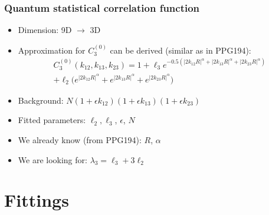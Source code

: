 \documentclass{beamer}
\begin{document}
\begin{frame}
\frametitle{Quantum statistical correlation function}
\begin{itemize}
\setlength{\itemsep}{16pt}
\item Dimension: 9D $\rightarrow$ 3D
\item Approximation for $C_3^{(0)}$ can be derived (similar as in PPG194):
\begin{align}
C_3^{(0)}(k_{12}, k_{13}, k_{23}) = 1+ \ell_3e^{-0.5(|2k_{12}R|^\alpha+|2k_{13}R|^\alpha+|2k_{23}R|^\alpha)}\nonumber\\
+\ell_2\bigg(e^{|2k_{12}R|^\alpha}+e^{|2k_{13}R|^\alpha}+e^{|2k_{23}R|^\alpha}\bigg)
\end{align}
\item Background: $N(1+\epsilon k_{12})(1+\epsilon k_{13})(1+\epsilon k_{23})$
\item Fitted parameters: $\ell_2, \ell_3$, $\epsilon$, $N$
\item We already know (from PPG194): $R$, $\alpha$
\item We are looking for: $\lambda_3=\ell_3+3\ell_2$
\end{itemize}
\end{frame}


\section{Fittings}
\end{document}
